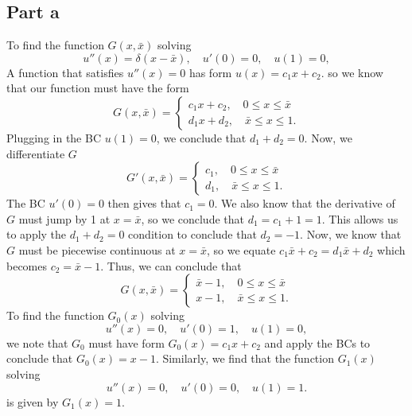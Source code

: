 \documentclass{article}
\begin{document}
\subsection{Part a}
To find the function
$G(x,\bar x)$ solving
\[
u''(x) = \delta(x-\bar x), \quad u'(0)=0, \quad u(1)=0,
\]
A function that satisfies $u''(x)=0$ has form $u(x)=c_1x+c_2$. so we know that our function must have the form 
\[
G(x,\bar x)=\begin{cases}
c_1x+c_2, \quad 0\leq x\leq\bar{x}\\
d_1x+d_2, \quad \bar{x}\leq x\leq 1.
\end{cases}
\]
Plugging in the BC $u(1)=0$, we conclude that $d_1+d_2=0$. Now, we differentiate $G$
\[
G'(x,\bar x)=\begin{cases}
c_1, \quad 0\leq x\leq\bar{x}\\
d_1, \quad \bar{x}\leq x\leq 1.
\end{cases}
\]
The BC $u'(0)=0$ then gives that $c_1=0$. We also know that the derivative of $G$ must jump by 1 at $x=\bar{x}$, so we conclude that $d_1=c_1+1=1$. This allows us to apply the $d_1+d_2=0$ condition to conclude that $d_2=-1$. Now, we know that $G$ must be piecewise continuous at $x=\bar{x}$, so we equate $c_1\bar{x}+c_2=d_1\bar{x}+d_2$ which becomes $c_2=\bar{x}-1$. Thus, we can conclude that 
\[
G(x,\bar x)=\begin{cases}
\bar{x}-1, \quad 0\leq x\leq\bar{x}\\
x-1, \quad \bar{x}\leq x\leq 1.
\end{cases}
\]
To find the function $G_0(x)$ solving
\[
u''(x) = 0, \quad u'(0)=1, \quad u(1)=0,
\]
we note that $G_0$ must have form $G_0(x)=c_1x+c_2$ and apply the BCs to conclude that $G_0(x)=x-1$. Similarly, we find that the function $G_1(x)$ solving
\[
u''(x) = 0, \quad u'(0)=0, \quad u(1)=1.
\]
is given by $G_1(x)=1$.
\end{document}
